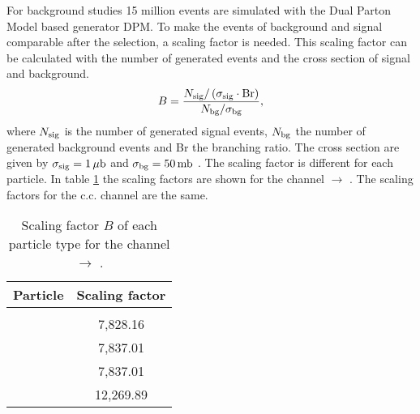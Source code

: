 For background studies 15 million events are simulated with the Dual Parton Model based generator DPM.
To make the events of background and signal comparable after the selection, a scaling factor is needed.
This scaling factor can be calculated with the number of generated events and the cross section of signal and background.
\begin{equation}
		B = \frac{N_{\textnormal{sig}}/\left(\sigma_{\textnormal{sig}} \cdot \textnormal{Br}\right)}{N_{\textnormal{bg}}/\sigma_{\textnormal{bg}}},
\label{eq:bg_scaling}
\end{equation}
where $N_{\textnormal{sig}}$ is the number of generated signal events, $N_{\textnormal{bg}}$ the number of generated background events and Br the 
branching ratio. The cross section are given by $\sigma_{\textnormal{sig}} = 1\,\mu\textnormal{b}$ and $\sigma_{\textnormal{bg}} = 50\, \textnormal{mb}$ \cite{PANDAphysics2009}.
The scaling factor is different for each particle.
In table \ref{tab:bg_scaling} the scaling factors are shown for the channel \pbarpSystem $\rightarrow$ \excitedcascade \anticascade.
The scaling factors for the c.c. channel are the same. 

\begin{table}
	\centering
	\caption{Scaling factor $B$ of each particle type for the channel \pbarpSystem $\rightarrow$ \excitedcascade \anticascade.}
	\label{tab:bg_scaling}
	\begin{tabular}{cc}
		\hline
		 Particle & Scaling factor \\
		\hline
		\hline
		&  \\
		\lam & 7,828.16\\
		\anticascade & 7,837.01 \\
		\excitedcascade & 7,837.01\\
		\excitedcascade \anticascade & 12,269.89\\
		\hline
		 
	 \end{tabular}
\end{table}
	